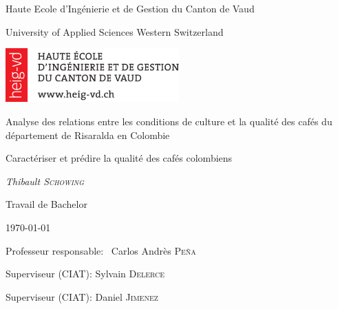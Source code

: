 \documentclass[11pt,a4paper,twoside,openright]{report}
\author{Thibault Schowing}
\makeatletter
\newif\if@mainmatter \@mainmattertrue
\newcommand\frontmatter{%
	\cleardoublepage
	\@mainmatterfalse
	\pagenumbering{roman}}
\newcommand\blankpage{%
	\null
	\thispagestyle{empty}%
	\addtocounter{page}{-1}%
	\newpage}
\makeatother
\begin{document}
	
	
	\dominitoc
	\begin{titlepage}
		\centering
		
		\small{Haute Ecole d'Ingénierie et de Gestion du Canton de Vaud  \par}
		\footnotesize{University of Applied Sciences Western Switzerland\par}
		\vspace{1cm}
		
		\includegraphics[width=0.5\textwidth]{HEIG-VDLogo}\par
		
		\vspace{1cm}
		\Large{Analyse des relations entre les conditions de culture et la qualité des cafés du département de Risaralda en Colombie\par}
		\vspace{1.5cm}
		\small{Caractériser et prédire la qualité des cafés colombiens \par}
		\vspace{2cm}
		\small\textit{Thibault \textsc{Schowing}}\par
		\small{Travail de Bachelor}\par
		\small{\today\par}
		
		\vfill
		Professeur responsable: ~Carlos Andrès \textsc{Peña}\par
		Superviseur (CIAT): Sylvain \textsc{Delerce} \par
		Superviseur (CIAT): Daniel \textsc{Jimenez}
		
		
	\end{titlepage}
	\restoregeometry 
	
	\frontmatter
	
	
\end{document}
